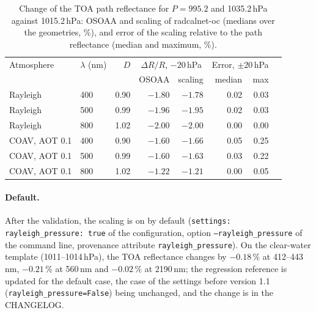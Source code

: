 \documentclass[11pt,a4paper]{article}
\newcommand{\code}[1]{\texttt{#1}}
\begin{document}
\begin{table}[h]
\centering\small
\caption{Change of the TOA path reflectance for $P = 995.2$ and 1035.2\,hPa against 1015.2\,hPa: OSOAA and scaling of
radcalnet-oc (medians over the geometries, \%), and error of the scaling relative to the path reflectance (median and
maximum, \%).}
\label{tab:pressure_osoaa}
\begin{tabular}{llrrrrrr}
\toprule
Atmosphere & $\lambda$ (nm) & $D$ & \multicolumn{2}{c}{$\Delta R/R$, $-20$\,hPa} & \multicolumn{2}{c}{Error, $\pm20$\,hPa} & \\
 & & & OSOAA & scaling & median & max & \\
\midrule
Rayleigh            & 400 & 0.90 & $-1.80$ & $-1.78$ & 0.02 & 0.03 & \\
Rayleigh            & 500 & 0.99 & $-1.96$ & $-1.95$ & 0.02 & 0.03 & \\
Rayleigh            & 800 & 1.02 & $-2.00$ & $-2.00$ & 0.00 & 0.00 & \\
COAV, AOT 0.1       & 400 & 0.90 & $-1.60$ & $-1.66$ & 0.05 & 0.25 & \\
COAV, AOT 0.1       & 500 & 0.99 & $-1.60$ & $-1.63$ & 0.03 & 0.22 & \\
COAV, AOT 0.1       & 800 & 1.02 & $-1.22$ & $-1.21$ & 0.00 & 0.05 & \\
\bottomrule
\end{tabular}
\end{table}

\paragraph{Default.} After the validation, the scaling is on by default (\code{settings: rayleigh\_pressure: true}
of the configuration, option \code{--rayleigh\_pressure} of the command line, provenance attribute
\code{rayleigh\_pressure}). On the clear-water template (1011--1014\,hPa), the TOA reflectance changes by
$-0.18\,\%$ at 412--443\,nm, $-0.21\,\%$ at 560\,nm and $-0.02\,\%$ at 2190\,nm; the regression reference is updated
for the default case, the case of the settings before version 1.1 (\code{rayleigh\_pressure=False}) being unchanged,
and the change is in the CHANGELOG.
\end{document}
